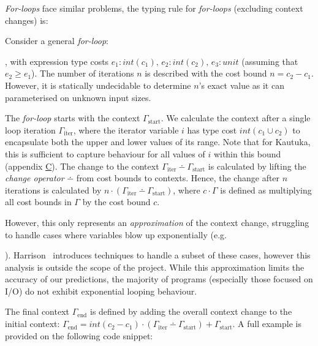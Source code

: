 \textit{For-loops} face similar problems, the typing rule for \textit{for-loops} (excluding context changes) is:

\begin{prooftree}
\end{prooftree}

Consider a general \textit{for-loop}: , with expression type costs \( e_1 : \textit{int}(c_1), \, e_2 : \textit{int}(c_2), \, e_3 : unit \) (assuming that \( e_2 \geq e_1 \)).  The number of iterations \( n \) is described with the cost bound \( n = c_2 - c_1 \). However, it is statically undecidable to determine \( n \)'s exact value as it can parameterised on unknown input sizes.

The \textit{for-loop} starts with the context \( \Gamma_\text{start} \). We calculate the context after a single loop iteration \( \Gamma_\text{iter} \), where the iterator variable \( i \) has type cost \( \textit{int}(c_1 \cup c_2) \) to encapsulate both the upper and lower values of its range. Note that for Kautuka, this is sufficient to capture behaviour for all values of \( i \) within this bound (appendix \hyperref[sec:C]{C}). The change to the context \( \Gamma_\text{iter} \dotminus \Gamma_\text{start} \) is calculated by lifting the \textit{change operator} \( \dotminus \) from cost bounds to contexts. Hence, the change after \( n \) iterations is calculated by \( n \cdot (\Gamma_\text{iter} \dotminus \Gamma_\text{start}) \), where \( c \cdot \Gamma \) is defined as multiplying all cost bounds in \( \Gamma \) by the cost bound \( c \).

However, this only represents an \textit{approximation} of the context change, struggling to handle cases where variables blow up exponentially (e.g. ). Harrison~\cite{harrison1977compiler} introduces techniques to handle a subset of these cases, however this analysis is outside the scope of the project. While this approximation limits the accuracy of our predictions, the majority of programs (especially those focused on I/O) do not exhibit exponential looping behaviour.

The final context \( \Gamma_\text{end} \) is defined by adding the overall context change to the initial context: \( \Gamma_\text{end} = \textit{int}(c_2 - c_1) \cdot (\Gamma_\text{iter} \dotminus \Gamma_\text{start}) + \Gamma_\text{start} \). A full example is provided on the following code snippet:

